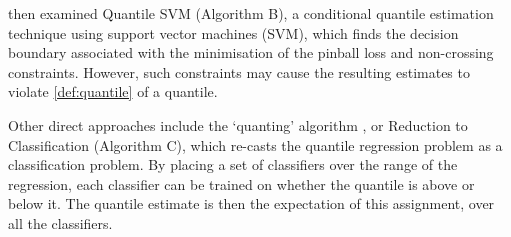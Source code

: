 \documentclass[twoside]{article} \usepackage{aistats2017}
\theoremstyle{definition}
\theoremstyle{theorem}
\begin{document}
%	
%	
%	
%	
	\cite{takeuchi2006nonparametric} then examined Quantile SVM (Algorithm B), a conditional quantile estimation technique using support vector machines (SVM), which finds the decision boundary associated with the minimisation of the pinball loss and non-crossing constraints. However, such constraints may cause the resulting estimates to violate \cref{def:quantile} of a quantile.
%	
%	

	Other direct approaches include the `quanting' algorithm \citep{langford2012predicting}, or Reduction to Classification (Algorithm C), which re-casts the quantile regression problem as a classification problem. By placing a set of classifiers over the range of the regression, each classifier can be trained on whether the quantile is above or below it. The quantile estimate is then the expectation of this assignment, over all the classifiers.
\end{document}
